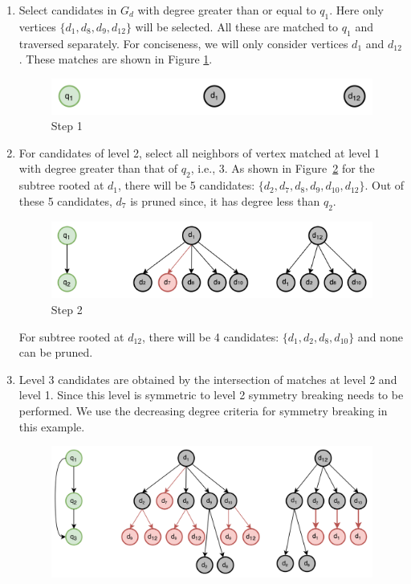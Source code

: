 \begin{enumerate}[Step 1:]
    \item Select candidates in $G_d$ with degree greater than or equal to $q_1$. Here only vertices $\{d_1, d_8, d_9, d_{12}\}$ will be selected. All these are matched to $q_1$ and traversed separately. For conciseness, we will only consider vertices $d_1$ and $d_{12}$. These matches are shown in Figure \ref{fig:sgm-step2}.
          \begin{figure}
              \includegraphics[width=\textwidth]{fig/LR/sgm-step2.png}
              \caption{Step 1}
              \label{fig:sgm-step2}
          \end{figure}
    \item For candidates of level 2, select all neighbors of vertex matched at level 1 with degree greater than that of $q_2$, i.e., 3. As shown in Figure\ \ref{fig:sgm-step3} for the subtree rooted at $d_1$, there will be 5 candidates: $\{d_2, d_7, d_8, d_9, d_{10}, d_{12}\}$. Out of these 5 candidates, $d_7$ is pruned since, it has degree less than $q_2$.\\
          \begin{figure}
              \includegraphics[width=\textwidth]{fig/LR/sgm-step3.png}
              \caption{Step 2}
              \label{fig:sgm-step3}
          \end{figure}
          For subtree rooted at $d_{12}$, there will be 4 candidates: $\{d_1, d_2, d_8, d_{10}\}$ and none can be pruned.
    \item Level 3 candidates are obtained by the intersection of matches at level 2 and level 1. Since this level is symmetric to level 2 symmetry breaking needs to be performed. We use the decreasing degree criteria for symmetry breaking in this example.
          \begin{figure}
              \includegraphics[width=\textwidth]{fig/LR/sgm-step4.png}

\end{figure}
\end{enumerate}
